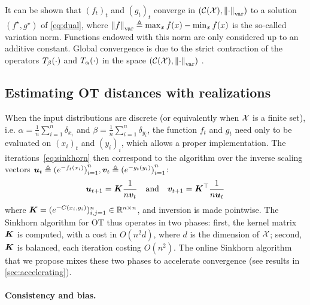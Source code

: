 It can be shown that ${(f_t)}_t$ and ${(g_t)}_t$ converge in $(\mathcal{C}(\mathcal{X}),
\left\| \cdot \right\|_{\text{var}})$ to a solution $(f^\star, g^\star)$ of
\eqref{eq:dual}, where $\left\| f \right\|_{\text{var}} \triangleq \max_x f(x) - \min_x f(x)$
is the so-called variation norm. Functions endowed with this norm are only
considered up to an additive constant.  Global convergence is due to the strict
contraction of the operators $T_{\beta}(\cdot)$ and
$T_{\alpha}(\cdot)$ in the space $(\mathcal{C}(\mathcal{X}), \left\| \cdot \right\|_{\text{var}})$
\citep{lemmens_nonlinear_2012}.

\subsection{Estimating OT distances with realizations}

When the input distributions are discrete (or equivalently when $\mathcal{X}$ is a
finite set), i.e. $\alpha = \frac{1}{n}\sum_{i=1}^n \delta_{x_i}$ and $\beta =
\frac{1}{n} \sum_{i=1}^n \delta_{y_i}$, the function $f_t$ and $g_t$ need only
to be evaluated on $(x_i)_t$ and $(y_i)_i$, which allows a proper
implementation. The iterations~\eqref{eq:sinkhorn} then correspond to the
\citet{sinkhorn1967concerning} algorithm over the inverse scaling vectors $\bm{u}_t
\triangleq {(e^{-f_t(x_i)})}_{i=1}^n, \bm{v}_t \triangleq
{(e^{-g_t(y_i)})}_{i=1}^n$:
\begin{equation*}
	\bm{u}_{t+1} = \bm{K} \frac{1}{n \bm{v}_t}
	\quad \text{and} \quad
	\bm{v}_{t+1} = \bm{K}^\top \frac{1}{n \bm{u}_t}
\end{equation*}
where $\bm{K}=(e^{-C(x_i,y_i)})_{i,j=1}^n \in \mathbb{R}^{n \times n}$, and inversion is made pointwise. The Sinkhorn algorithm for OT thus
operates in two phases: first, the kernel matrix $\bm{K}$ is computed, with a cost in
$O(n^2 d)$, where $d$ is the dimension of $\mathcal{X}$; second, $\bm{K}$ is balanced, each
iteration costing $O(n^2)$. The online Sinkhorn algorithm that we propose mixes
these two phases to accelerate convergence (see results in \autoref{sec:accelerating}).


\paragraph{Consistency and bias.}\label{sec:gradient}

